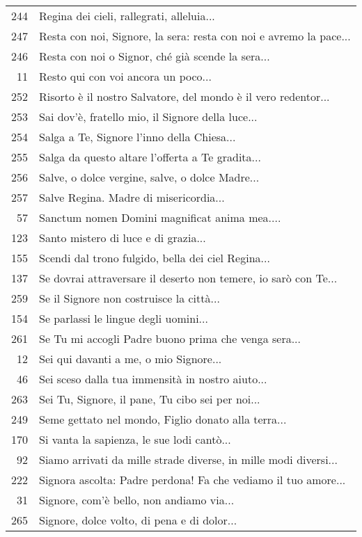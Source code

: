 {\begin{flushleft}
\begin{longtable}{r m{11cm}}
    244 & Regina dei cieli, rallegrati, alleluia...\\
    247 & Resta con noi, Signore, la sera: resta con noi e avremo la pace...\\
    246 & Resta con noi o Signor, ché già scende la sera...\\
    11 & Resto qui con voi ancora un poco...\\
    252 & Risorto è il nostro Salvatore, del mondo è il vero redentor...\\
    253 & Sai dov'è, fratello mio, il Signore della luce...\\
    254 & Salga a Te, Signore l'inno della Chiesa...\\
    255 & Salga da questo altare l'offerta a Te gradita...\\
    256 & Salve, o dolce vergine, salve, o dolce  Madre...\\
    257 & Salve Regina. Madre di misericordia...\\
    57 & Sanctum nomen Domini magnificat anima mea....\\
    123 & Santo mistero di luce e di grazia...\\
    155 & Scendi dal trono fulgido, bella dei ciel Regina...\\
    137 & Se dovrai attraversare il deserto non temere, io sarò con Te...\\
    259 & Se il Signore non costruisce la città...\\
    154 & Se parlassi le lingue degli uomini...\\
    261 & Se Tu mi accogli Padre buono prima che venga sera...\\
    12 & Sei qui davanti a me, o mio Signore...\\
    46 & Sei sceso dalla tua immensità in nostro aiuto...\\
    263 & Sei Tu, Signore, il pane, Tu cibo sei per noi...\\
    249 & Seme gettato nel mondo, Figlio donato alla terra...\\
    170 & Si vanta la sapienza, le sue lodi cantò...\\
    92 & Siamo arrivati da mille strade diverse, in mille modi diversi...\\
    222 & Signora ascolta: Padre perdona! Fa che vediamo il tuo amore...\\
    31 & Signore, com'è bello, non andiamo via...\\
    265 & Signore, dolce volto, di pena e di dolor...\\

\end{longtable}
\end{flushleft}}
